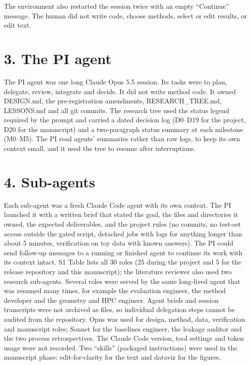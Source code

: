 \documentclass[10pt,letterpaper]{article}
\begin{document}
The environment also restarted the session twice with an empty ``Continue'' message. The human did not write code, choose methods, select or edit results, or edit text.

\section*{3. The PI agent}

The PI agent was one long Claude Opus 5.5 session. Its tasks were to plan, delegate, review, integrate and decide. It did not write method code. It owned DESIGN.md, the pre-registration amendments, RESEARCH\_TREE.md, LESSONS.md and all git commits. The research tree used the status legend required by the prompt and carried a dated decision log (D0--D19 for the project, D20 for the manuscript) and a two-paragraph status summary at each milestone (M0--M5). The PI read agents' summaries rather than raw logs, to keep its own context small, and it used the tree to resume after interruptions.

\section*{4. Sub-agents}

Each sub-agent was a fresh Claude Code agent with its own context. The PI launched it with a written brief that stated the goal, the files and directories it owned, the expected deliverables, and the project rules (no commits, no test-set access outside the gated script, detached jobs with logs for anything longer than about 5 minutes, verification on toy data with known answers). The PI could send follow-up messages to a running or finished agent to continue its work with its context intact. S1 Table lists all 30 roles (25 during the project and 5 for the release repository and this manuscript); the literature reviewer also used two research sub-agents. Several roles were served by the same long-lived agent that was resumed many times, for example the evaluation engineer, the method developer and the geometry and HPC engineer. Agent briefs and session transcripts were not archived as files, so individual delegation steps cannot be audited from the repository. Opus was used for design, method, data, verification and manuscript roles; Sonnet for the baselines engineer, the leakage auditor and the two process retrospectives. The Claude Code version, tool settings and token usage were not recorded. Two ``skills'' (packaged instructions) were used in the manuscript phase: edit-for-clarity for the text and dataviz for the figures.
\end{document}
